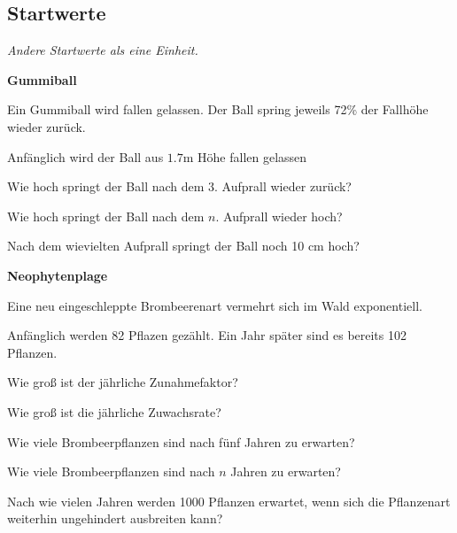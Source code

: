 \subsection{Startwerte}
\textit{Andere Startwerte als eine Einheit.}


\bbwActAufgabenNr{} \textbf{Gummiball}

Ein Gummiball wird fallen gelassen. Der Ball spring jeweils 72\% der Fallhöhe wieder zurück.

Anfänglich wird der Ball aus $1.7 \textrm{m}$ Höhe fallen gelassen

\begin{bbwAufgabenBlock}

\item Wie hoch springt der Ball nach dem 3. Aufprall wieder zurück?
\item Wie hoch springt der Ball nach dem $n$. Aufprall wieder hoch?
\item Nach dem wievielten Aufprall springt der Ball noch 10 cm hoch?
\end{bbwAufgabenBlock}
\platzFuerBerechnungenBisEndeSeite{}



\bbwActAufgabenNr{} \textbf{Neophytenplage}

Eine neu eingeschleppte Brombeerenart vermehrt sich im Wald exponentiell.

Anfänglich werden 82 Pflazen gezählt. Ein Jahr später sind es bereits 102 Pflanzen.

\begin{bbwAufgabenBlock}

\item Wie groß ist der jährliche Zunahmefaktor?
\item Wie groß ist die jährliche Zuwachsrate?
      
\item Wie viele Brombeerpflanzen sind nach fünf Jahren zu erwarten?

\item Wie viele Brombeerpflanzen sind nach $n$ Jahren zu erwarten?
\item Nach wie vielen Jahren werden 1000 Pflanzen erwartet, wenn sich die Pflanzenart weiterhin ungehindert ausbreiten kann?
\end{bbwAufgabenBlock}
\platzFuerBerechnungenBisEndeSeite{}




